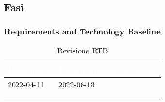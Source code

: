 \subsection{Fasi} 
{
    \subsubsection{Requirements and Technology Baseline} 
    {
        \setlength{\freewidth}{\dimexpr\textwidth-30\tabcolsep}
        \renewcommand{\arraystretch}{1.0}
        \setlength{\aboverulesep}{0pt}
        \setlength{\belowrulesep}{0pt}
        \begin{longtable}{C{.4\freewidth} C{.4\freewidth}}
        \toprule
        \textcolor{white}{\textbf{Data inizio}}&
        \textcolor{white}{\textbf{Data previsione revisione}} \\
        \toprule
        \endhead
            
        2022-04-11 & 2022-06-13 \\
        \bottomrule
        \\
        \caption{Revisione RTB}
        \end{longtable}

}}
